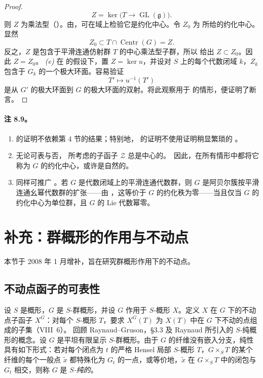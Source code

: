 \begin{proof}
\[
  Z=\ker\bigl(T\longrightarrow\operatorname{GL}(\mathfrak g)\bigr).
\]
则 \(Z\) 为乘法型（）。由\textup{}，可在域上检验它是约化中心。令 \(Z_0\) 为\textup{} 所给的约化中心。显然
\[
  Z_0\subset T\cap\operatorname{Centr}(G)=Z.
\]
反之，\(Z\) 是包含于平滑连通仿射群 \(T\) 的中心乘法型子群，所以\textup{} 给出 \(Z\subset Z_0\)。因此 \(Z=Z_0\)。
\emph{(e)} 在  的假设下，置 \(Z=\ker u\)，并设对 \(S\) 上的每个代数闭域 \(k\)，\(Z_k\) 包含于 \(G_k\) 的一个极大环面。容易验证
\[
  T'\longmapsto u^{-1}(T')
\]
是从 \(G'\) 的极大环面到 \(G\) 的极大环面的双射。将此观察用于\textup{} 的情形，便证明了断言。
\end{proof}
\paragraph{\textbf{注 8.9。}}
\begin{enumerate}
\item[\emph{(a)}]  的证明不依赖第 4 节的结果；特别地， 的证明不使用证明稍显繁琐的 。
\item[\emph{(b)}] 无论可表与否， 所考虑的子函子 \(\mathcal Z\) 总是中心的。\ 因此，在所有情形中都将它称为 \(G\) 的约化中心，或许是自然的。
\item[\emph{(c)}] 同样可推广 。若 \(G\) 是代数闭域上的平滑连通代数群，则 \(G\) 是阿贝尔簇按平滑连通幺幂代数群的扩张——由 ，这等价于 \(G\) 的约化秩为零——当且仅当 \(G\) 的约化中心为单位群，且 \(G\) 的 Lie 代数幂零。
\end{enumerate}
\section{补充：群概形的作用与不动点}
本节于 2008 年 1 月增补，旨在研究群概形作用下的不动点。
\subsection{不动点函子的可表性}
设 \(S\) 是概形，\(G\) 是 \(S\)-群概形，并设 \(G\) 作用于 \(S\)-概形 \(X\)。定义 \(X\) 在 \(G\) 下的不动点子函子 \(X^G\)：对每个 \(S\)-概形 \(T\)，要求 \(X^G(T)\) 为 \(X(T)\) 中在 \(G\) 下不动的点组成的子集（VIII~6）。
回顾 Raynaud--Gruson，\S3.3 及 Raynaud 所引入的 \(S\)-纯概形的概念。设 \(G\) 是平坦有限呈示 \(S\)-群概形。由于 \(G\) 的纤维没有嵌入分支，纯性具有如下形式：若对每个闭点为 \(t\) 的严格 Hensel 局部 \(S\)-概形 \(T\)，\(G\times_S T\) 的某个纤维的每个一般点 \(\widetilde x\) 都特殊化为 \(G_t\) 的一点，或等价地，\(\widetilde x\) 在 \(G\times_S T\) 中的闭包与 \(G_t\) 相交，则称 \(G\) 是 \emph{\(S\)-纯的}。

